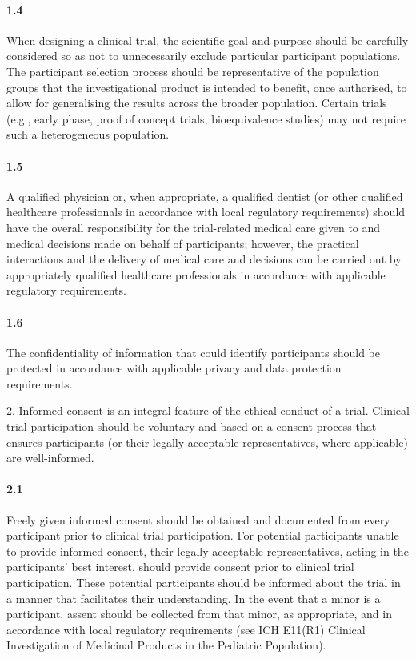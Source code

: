 \documentclass[11pt]{article}
\begin{document}
\paragraph{1.4} When designing a clinical trial, the scientific goal and purpose should be carefully considered so as not to unnecessarily exclude particular participant populations. The participant selection process should be representative of the population groups that the investigational product is intended to benefit, once authorised, to allow for generalising the results across the broader population. Certain trials (e.g., early phase, proof of concept trials, bioequivalence studies) may not require such a heterogeneous population.

\paragraph{1.5} A qualified physician or, when appropriate, a qualified dentist (or other qualified healthcare professionals in accordance with local regulatory requirements) should have the overall responsibility for the trial-related medical care given to and medical decisions made on behalf of participants; however, the practical interactions and the delivery of medical care and decisions can be carried out by appropriately qualified healthcare professionals in accordance with applicable regulatory requirements.

\paragraph{1.6} The confidentiality of information that could identify participants should be protected in accordance with applicable privacy and data protection requirements.

2. Informed consent is an integral feature of the ethical conduct of a trial. Clinical trial participation should be voluntary and based on a consent process that ensures participants (or their legally acceptable representatives, where applicable) are well-informed.


\paragraph{2.1} Freely given informed consent should be obtained and documented from every participant prior to clinical trial participation. For potential participants unable to provide informed consent, their legally acceptable representatives, acting in the participants' best interest, should provide consent prior to clinical trial participation. These potential participants should be informed about the trial in a manner that facilitates their understanding. In the event that a minor is a participant, assent should be collected from that minor, as appropriate, and in accordance with local regulatory requirements (see ICH E11(R1) Clinical Investigation of Medicinal Products in the Pediatric Population).
\end{document}
